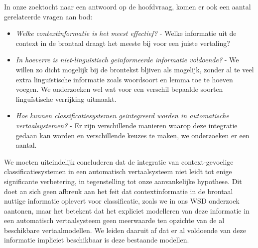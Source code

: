 In onze zoektocht naar een antwoord op de hoofdvraag, komen er ook een aantal gerelateerde vragen aan bod:

\begin{itemize}
\item \emph{Welke contextinformatie is het meest effectief?} - Welke informatie uit de context in de brontaal draagt het
    meeste bij voor een juiste vertaling?
\item \emph{In hoeverre is niet-linguïstisch geinformeerde informatie voldoende?} - We willen zo dicht mogelijk bij de
    brontekst bljiven als mogelijk, zonder al te veel extra linguïstische informatie zoals woordsoort en lemma toe te
    hoeven voegen. We onderzoeken wel wat voor een verschil bepaalde soorten linguïstische verrijking uitmaakt.
\item \emph{Hoe kunnen classificatiesystemen geintegreerd worden in automatische vertaalsystemen?} - Er zijn
    verschillende manieren waarop deze integratie gedaan kan worden en verschillende keuzes te maken, we onderzoeken er een aantal.
\end{itemize}

We moeten uiteindelijk concluderen dat de integratie van context-gevoelige classificatiesystemen in een automatisch
vertaalsysteem niet leidt tot enige significante verbetering, in tegenstelling tot onze aanvankelijke hypothese. Dit
doet an sich geen afbreuk aan het feit dat contextinformatie in de brontaal nuttige informatie oplevert voor
classificatie, zoals we in ons WSD onderzoek aantonen, maar het betekent dat het expliciet modelleren van deze
informatie in een automatisch vertaalsysteem geen meerwaarde ten opzichte van de al beschikbare vertaalmodellen. We
leiden daaruit af dat er al voldoende van deze informatie impliciet beschikbaar is deze bestaande modellen.

